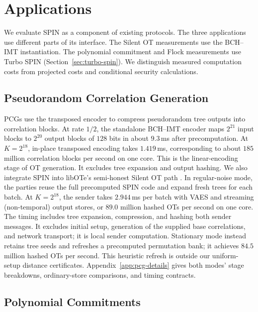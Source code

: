 \section{Applications}
\label{sec:applications}

We evaluate SPIN as a component of existing protocols.
The three applications use different parts of its interface.
The Silent OT measurements use the BCH--IMT instantiation. The polynomial
commitment and Flock measurements use Turbo SPIN
(Section~\ref{sec:turbo-spin}).
We distinguish measured computation costs from
projected costs and conditional security calculations.

\subsection{Pseudorandom Correlation Generation}
\label{sec:spin-pcg}

PCGs use the transposed encoder to compress pseudorandom tree outputs
into correlation blocks. At rate $1/2$, the standalone BCH--IMT encoder maps
$2^{21}$ input blocks to $2^{20}$ output blocks of $128$ bits in about
$9.3$\,ms after precomputation.
At $K=2^{18}$, in-place transposed encoding takes $1.419$\,ms,
corresponding to about $185$ million correlation blocks per second on one core.
This is the linear-encoding stage of OT generation. It excludes tree
expansion and output hashing.
We also integrate SPIN into libOTe's semi-honest Silent OT path
\cite{bcg19tworound}. In regular-noise mode, the parties reuse the full
precomputed SPIN code and expand fresh trees for each batch.
At $K=2^{18}$, the sender takes $2.944$\,ms per batch with VAES and
streaming (non-temporal) output stores, or $89.0$ million hashed OTs per second on one core.
The timing includes tree expansion, compression, and hashing both sender
messages. It excludes initial setup, generation of the supplied
base correlations, and network transport; it is local sender computation.
Stationary mode instead retains tree seeds and refreshes a precomputed
permutation bank; it achieves $84.5$ million hashed OTs per second.
This heuristic refresh is outside our uniform-setup distance certificates.
Appendix~\ref{app:pcg-details} gives both modes' stage breakdowns,
ordinary-store comparisons, and timing contracts.

\subsection{Polynomial Commitments}
\label{sec:spin-pcs}

